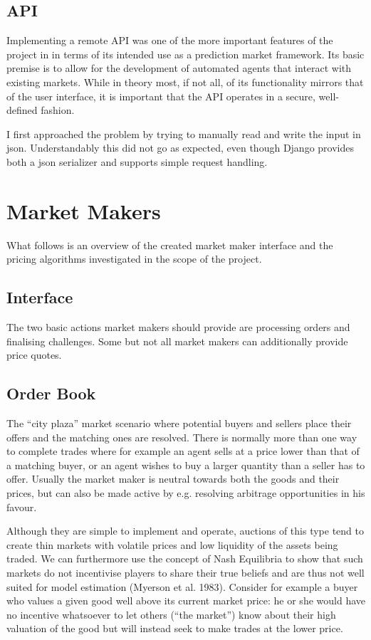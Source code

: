 \documentclass[bsc,frontabs,twoside,singlespacing,parskip,deptreport]{infthesis}     %
\begin{document}
\subsection{API}
    
    Implementing a remote API was one of the more important features of the project in in terms of its intended use as a prediction market framework. Its basic premise is to allow for the development of automated agents that interact with existing markets. While in theory most, if not all, of its functionality mirrors that of the user interface, it is important that the API operates in a secure, well-defined fashion.
    
    I first approached the problem by trying to manually read and write the input in json. Understandably this did not go as expected, even though Django provides both a json serializer and supports simple request handling. 
    
\section{Market Makers}
    What follows is an overview of the created market maker interface and the pricing algorithms investigated in the scope of the project.

\subsection{Interface}
    The two basic actions market makers should provide are processing orders and finalising challenges. Some but not all market makers can additionally provide price quotes. 
    
\subsection{Order Book}
    
    The “city plaza” market scenario where potential buyers and sellers place their offers and the matching ones are resolved. There is normally more than one way to complete trades where for example an agent sells at a price lower than that of a matching buyer, or an agent wishes to buy a larger quantity than a seller has to offer. Usually the market maker is neutral towards both the goods and their prices, but can also be made active by e.g. resolving arbitrage opportunities in his favour.

    Although they are simple to implement and operate, auctions of this type tend to create thin markets with volatile prices and low liquidity of the assets being traded. We can furthermore use the concept of Nash Equilibria to show that such markets do not incentivise players to share their true beliefs and are thus not well suited for model estimation (Myerson et al. 1983). Consider for example a buyer who values a given good well above its current market price: he or she would have no incentive whatsoever to let others (“the market”) know about their high valuation of the good but will instead seek to make trades at the lower price.
    
\end{document}
